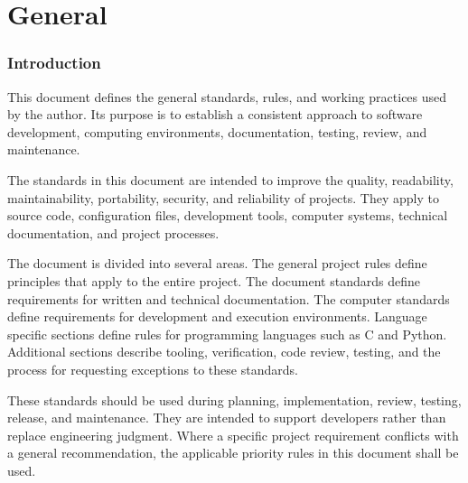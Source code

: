 \documentclass[11pt,a4paper]{article}
\begin{document}
\maketitle
\tableofcontents
\newpage


\pagebreak
\part{General}

\section{Introduction}
%
This document defines the general standards, rules, and working practices used by the author. Its purpose is to establish a consistent approach to software development, computing environments, documentation, testing, review, and maintenance.

The standards in this document are intended to improve the quality, readability, maintainability, portability, security, and reliability of
projects. They apply to source code, configuration files, development tools, computer systems, technical documentation, and project processes.

The document is divided into several areas. The general project rules define principles that apply to the entire project. The document standards define requirements for written and technical documentation. The computer standards define requirements for development and execution environments. Language specific sections define rules for programming languages such as C and Python. Additional sections describe tooling, verification, code review, testing, and the process for requesting exceptions to these standards.

These standards should be used during planning, implementation, review, testing, release, and maintenance. They are intended to support developers rather than replace engineering judgment. Where a specific project requirement conflicts with a general recommendation, the applicable priority rules in this document shall be used.
\end{document}
